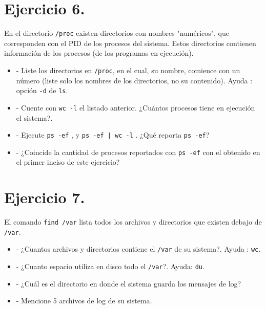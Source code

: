 \documentclass[12pt]{article}
\begin{document}
\section{Ejercicio 6.}
En el directorio \texttt{/proc} existen directorios con nombres "numéricos", que corresponden con el PID de los procesos del sistema.
Estos directorios contienen información de los procesos (de los programas en ejecución).
\begin{itemize}
\item - Liste los directorios en \texttt{/proc}, en el cual, su nombre, comience con un número (liste solo los nombres de los directorios, no su contenido). Ayuda : opción \texttt{-d} de \texttt{ls}.
\item - Cuente con \texttt{wc -l} el listado anterior. ¿Cuántos procesos tiene en ejecución el sistema?.
\item - Ejecute \texttt{ps -ef} , y \texttt{ps -ef | wc -l} . ¿Qué reporta \texttt{ps -ef}?
\item - ¿Coincide la cantidad de procesos reportados con \texttt{ps -ef} con el obtenido en el primer inciso de este ejercicio?
\end{itemize}


\section{Ejercicio 7.}
El comando \texttt{find /var} lista todos los archivos y directorios que existen debajo de \texttt{/var}.
\begin{itemize}
\item - ¿Cuantos archivos y directorios contiene el \texttt{/var} de su sistema?. Ayuda : \texttt{wc}.
\item - ¿Cuanto espacio utiliza en disco todo el \texttt{/var}?. Ayuda: \texttt{du}.
\item - ¿Cuál es el directorio en donde el sistema guarda los mensajes de log?
\item - Mencione 5 archivos de log de su sistema.
\end{itemize}
\end{document}
